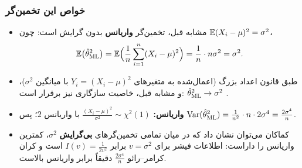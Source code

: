 \subsubsection{خواص این تخمین‌گر}
\begin{itemize}
\item مشابه قبل، تخمین‌گر \textbf{واریانس} بدون گرایش است: چون $\mathbb{E}(X_i-\mu)^2=\sigma^2$،
\[
\mathbb{E}\big(\hat\theta^2_{\mathrm{ML}}\big)=\mathbb{E}\Big(\frac1n\sum_{i=1}^n(X_i-\mu)^2\Big)=\frac1n\cdot n\sigma^2=\sigma^2 .
\]
\item طبق قانون اعداد بزرگ (اعمال‌شده به متغیرهای  $Y_i=(X_i-\mu)^2$ با میانگین $\sigma^2$)، و مشابه قبل، خاصیت سازگاری  نیز برقرار است: $\hat\theta^2_{\mathrm{ML}}\to\sigma^2$ .
\item \textbf{واریانس:} $\frac{(X_i-\mu)^2}{\sigma^2}\sim\chi^2(1)$ با واریانس $2$؛ پس $\operatorname{Var}(\hat\theta^2_{\mathrm{ML}})=\frac1{n^2}\cdot n\cdot2\sigma^4=\frac{2\sigma^4}{n}$.
\item کماکان می‌توان نشان داد که در میان تمامی تخمین‌گرهای \textbf{بی‌گرایش} $\sigma^2$، کمترین واریانس را داراست: اطلاعات فیشر برای $v=\sigma^2$ برابر $I(v)=\frac{1}{2v^2}$ است و کران کرامر--رائو $\frac{2\sigma^4}{n}$ دقیقاً برابر واریانس بالاست.
\end{itemize}

